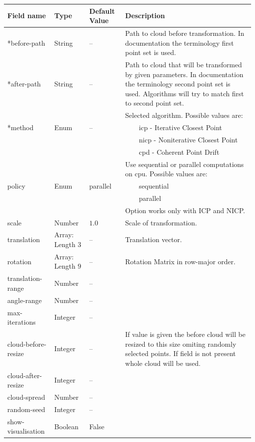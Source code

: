 \documentclass[titlepage]{article}
\newcommand{\tabitem}{~~\llap{\textbullet}~~}
\begin{document}
\begin{center}
\def\arraystretch{1.5}
\begin{longtable}{ | m{13em} | m{5em} | m{3em}| m{19em}| } 
 \hline
 Field name & Type & Default Value & Description \\
 \hline
 \hline
 *before-path & String & -- & Path to cloud before transformation. In documentation the terminology first point set is used. \\
 \hline
 *after-path & String & -- & Path to cloud that will be transformed by given parameters. In documentation the terminology second point set is used. Algorithms will try to match first to second point set. \\
 \hline
  & & & Selected algorithm. Possible values are: \\
  *method & Enum & -- & \tabitem icp - Iterative Closest Point \\
  & & & \tabitem nicp - Noniterative Closest Point \\
  & & & \tabitem cpd - Coherent Point Drift \\
 \hline
  & & & Use sequential or parallel computations on cpu. Possible values are:\\
 policy & Enum & parallel & \tabitem sequential \\
  & & & \tabitem parallel \\
  & & & Option works only with ICP and NICP. \\ 
 \hline
 scale & Number & $1.0$ & Scale of transformation. \\ 
 \hline
 translation & Array: Length $3$ & -- & Translation vector. \\ 
 \hline
 rotation & Array: Length $9$ & -- & Rotation Matrix in row-major order. \\ 
 \hline
 translation-range & Number & -- & \\ 
 \hline
 angle-range & Number & -- & \\ 
 \hline
 max-iterations & Integer & -- &  \\ 
 \hline
 cloud-before-resize & Integer & -- & If value is given the before cloud will be resized to this size omiting randomly selected points. If field is not present whole cloud will be used. \\ 
 \hline
 cloud-after-resize & Integer & -- & \\ 
 \hline
 cloud-spread & Number & -- & \\ 
 \hline
 random-seed & Integer & -- & \\ 
 \hline
 show-visualisation & Boolean & False & \\ 

\end{longtable}
\end{center}
\end{document}
